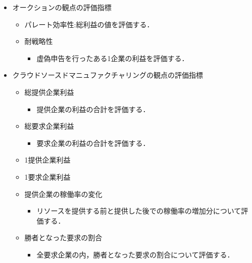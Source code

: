 \begin{itemize}
\tightlist
\item
  オークションの観点の評価指標

  \begin{itemize}
  \tightlist
  \item
    パレート効率性:総利益の値を評価する．
  \item
    耐戦略性

    \begin{itemize}
    \tightlist
    \item
      虚偽申告を行ったある1企業の利益を評価する．
    \end{itemize}
  \end{itemize}
\item
  クラウドソースドマニュファクチャリングの観点の評価指標

  \begin{itemize}
  \tightlist
  \item
    総提供企業利益

    \begin{itemize}
    \tightlist
    \item
      提供企業の利益の合計を評価する．
    \end{itemize}
  \item
    総要求企業利益

    \begin{itemize}
    \tightlist
    \item
      要求企業の利益の合計を評価する．
    \end{itemize}
  \item
    1提供企業利益
  \item
    1要求企業利益
  \item
    提供企業の稼働率の変化

    \begin{itemize}
    \tightlist
    \item
      リソースを提供する前と提供した後での稼働率の増加分について評価する．
    \end{itemize}
  \item
    勝者となった要求の割合

    \begin{itemize}
    \tightlist
    \item
      全要求企業の内，勝者となった要求の割合について評価する．
    \end{itemize}
  \end{itemize}
\end{itemize}

